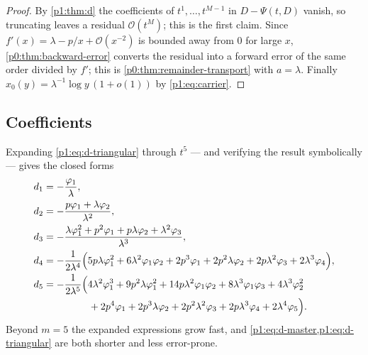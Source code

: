 \documentclass[11pt,a4paper,oneside]{book}
\theoremstyle{plain}
\theoremstyle{definition}
\theoremstyle{remark}
\newcommand{\bigO}{\mathcal{O}}
\newcommand{\littleo}{o}
\begin{document}
\begin{proof}
By \cref{p1:thm:d} the coefficients of $t^{1},\ldots,t^{M-1}$ in $D-\Psi(t,D)$ vanish, so
truncating leaves a residual $\bigO(t^{M})$; this is the first claim. Since
$f'(x)=\lambda-p/x+\bigO(x^{-2})$ is bounded away from $0$ for large $x$,
\cref{p0:thm:backward-error} converts the residual into a forward error of the same order
divided by $f'$; this is \cref{p0:thm:remainder-transport} with $a=\lambda$.  Finally
$x_0(y)=\lambda^{-1}\log y\,(1+\littleo(1))$ by \cref{p1:eq:carrier}.
\end{proof}

\subsection{Coefficients}

Expanding \cref{p1:eq:d-triangular} through $t^{5}$ --- and verifying the result symbolically
--- gives the closed forms
\begin{align}
 d_1&=-\frac{\varphi_1}{\lambda},
 \label{p1:eq:d1}\\
 d_2&=-\frac{p\varphi_1+\lambda\varphi_2}{\lambda^{2}},
 \label{p1:eq:d2}\\
 d_3&=-\frac{\lambda\varphi_1^{2}+p^{2}\varphi_1+p\lambda\varphi_2
 +\lambda^{2}\varphi_3}{\lambda^{3}},
 \label{p1:eq:d3}\\
 d_4&=-\frac{1}{2\lambda^{4}}
 \Bigl(5p\lambda\varphi_1^{2}+6\lambda^{2}\varphi_1\varphi_2
 +2p^{3}\varphi_1+2p^{2}\lambda\varphi_2+2p\lambda^{2}\varphi_3
 +2\lambda^{3}\varphi_4\Bigr),
 \label{p1:eq:d4}\\
 d_5&=-\frac{1}{2\lambda^{5}}
 \Bigl(4\lambda^{2}\varphi_1^{3}+9p^{2}\lambda\varphi_1^{2}
 +14p\lambda^{2}\varphi_1\varphi_2+8\lambda^{3}\varphi_1\varphi_3
 +4\lambda^{3}\varphi_2^{2}\notag\\
 &\hspace{16mm}
 +2p^{4}\varphi_1+2p^{3}\lambda\varphi_2+2p^{2}\lambda^{2}\varphi_3
 +2p\lambda^{3}\varphi_4+2\lambda^{4}\varphi_5\Bigr).
 \label{p1:eq:d5}
\end{align}
Beyond $m=5$ the expanded expressions grow fast, and \cref{p1:eq:d-master,p1:eq:d-triangular}
are both shorter and less error-prone.
\end{document}
